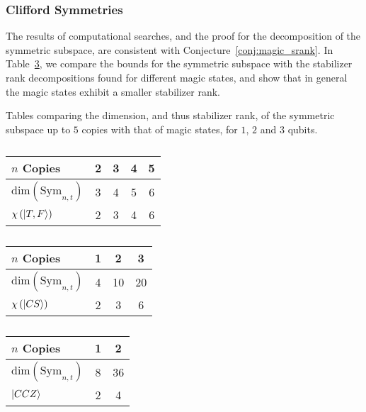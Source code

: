 \subsubsection{Clifford Symmetries}
The results of computational searches, and the proof for the decomposition of the symmetric subspace, are consistent with Conjecture~\ref{conj:magic_srank}. In Table~\ref{tab:srank_tables}, we compare the bounds for the symmetric subspace with the stabilizer rank decompositions found for different magic states, and show that in general the magic states exhibit a smaller stabilizer rank.\par
\begin{table}[H]
\centering
\caption{Tables comparing the dimension, and thus stabilizer rank, of the symmetric subspace up to $5$ copies with that of magic states, for $1$, $2$ and $3$ qubits.}\label{tab:srank_tables}
    \begin{subtable}[t]{0.6\textwidth}
    \caption{}
    \centering
        \begin{tabular}{|l|c|c|c|c|}
            \hline
            $n$ Copies & 2 & 3 & 4 & 5 \\
            \hline
            $\text{dim}\left(\text{Sym}_{n,t}\right)$ & 3 & 4 & 5 & 6 \\
            $\chi\left(\ket{T,F}\right)$ & 2 & 3 & 4 & 6 \\ \hline
        \end{tabular}
        \vspace{1cm}
    \end{subtable}
    \begin{subtable}[t]{0.48\textwidth}
    \centering
        \begin{tabular}{|l|c|c|c|}
            \hline
            $n$ Copies & 1 & 2 & 3 \\ \hline
            $\text{dim}\left(\text{Sym}_{n,t}\right)$ & 4 & 10 & 20 \\
            $\chi\left(\ket{CS}\right)$ & 2 & 3 & 6 \\ \hline
        \end{tabular}
        \caption{}
    \end{subtable}
    \begin{subtable}[t]{0.48\textwidth}
    \centering
        \begin{tabular}{|l|c|c|}
            \hline
            $n$ Copies & 1 & 2 \\ \hline
            $\text{dim}\left(\text{Sym}_{n,t}\right)$ & 8 & 36 \\
            $\ket{CCZ}$ & 2 & 4 \\ \hline
        \end{tabular}
        \caption{}
    \end{subtable}
\end{table}
